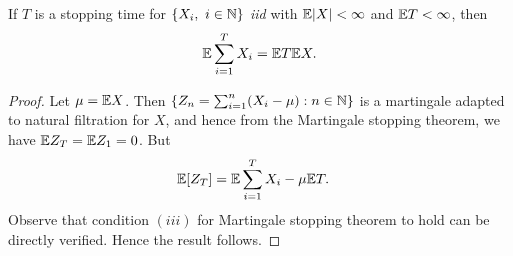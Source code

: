 \documentclass[a4paper,10pt,english]{article}
\begin{document}
\begin{cor} 
If $T$ is a stopping time for $\{X_i,~ i \in \mathbb{N}\}$ \textit{iid} with $\mathbb{E}|X|< \infty$ and $\mathbb{E} T < \infty$, then
\begin{align*}
\mathbb{E}\sum_{i=1}^{T}X_i =\mathbb{E} T\mathbb{E} X.
\end{align*}
\end{cor}
\begin{proof}
Let $\mu=\mathbb{E} X$. Then $\{Z_n = \sum_{i=1}^{n}(X_i-\mu): n \in \mathbb{N}\}$ is a martingale adapted to natural filtration for $X$,  and hence from the Martingale stopping theorem, we have $\mathbb{E} Z_T =\mathbb{E} Z_1=0$. 
But 
\begin{align*}
\E[Z_T] %
&=\E\sum_{i=1}^T X_i- \mu\E T.
\end{align*}
Observe that condition $(iii)$  for Martingale stopping theorem to hold can be directly verified. 
Hence the result follows. 
\end{proof}
\end{document}
